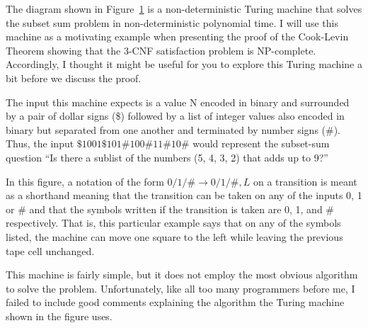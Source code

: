 

The diagram shown in Figure~\ref{Subset-sum-TM} is a non-deterministic Turing machine
that solves the subset sum problem in non-deterministic polynomial time. I will use this machine
as a motivating example when presenting the proof of the Cook-Levin Theorem showing
that the 3-CNF satisfaction problem is NP-complete. Accordingly, I thought it might be
useful for you to explore this Turing machine a bit before we discuss the proof.
	\begin{figure}
	\begin{center}
	\end{center}
	\label{Subset-sum-TM}
	\end{figure}
	
	The input this machine expects is a value N encoded in binary and surrounded by a pair of dollar signs (\$)
	followed by a list of integer values also encoded in binary but separated from one another and terminated
	by number signs (\#). Thus, the input $\$1001\$101\#100\#11\#10\#$ would represent the subset-sum
	question ``Is there a sublist of the numbers (5, 4, 3, 2) that adds up to 9?''

	In this figure, a notation of the form $0/1/\# \rightarrow 0/1/\#, L$ on a transition is meant as a shorthand
	meaning that the transition can be taken on any of the inputs 0, 1 or \# and that the symbols written
	if the transition is taken are 0, 1, and \# respectively. That is, this particular example says that on
	any of the symbols listed, the machine can move one square to the left while leaving the previous
	tape cell unchanged.
	
	This machine is fairly simple, but it does not employ the most obvious algorithm to solve
	the problem. Unfortunately, like all too many programmers before me, I failed to include
	good comments explaining the algorithm the Turing machine shown in the figure uses.
	
